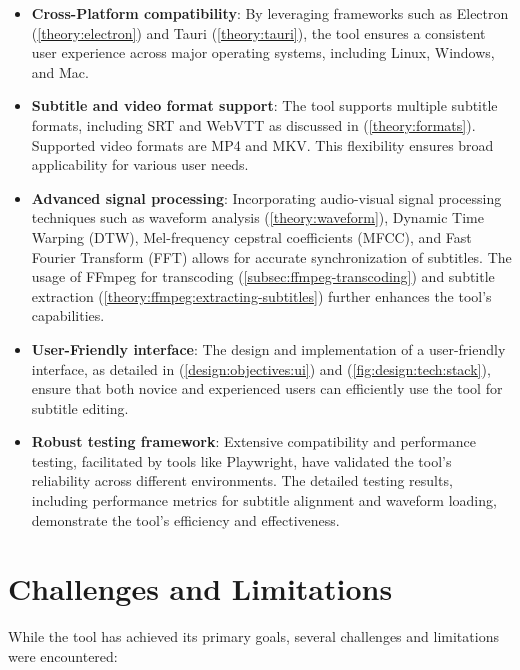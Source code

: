 \begin{itemize}
    \item \textbf{Cross-Platform compatibility}: By leveraging frameworks such as Electron (\ref{theory:electron}) and Tauri (\ref{theory:tauri}), the tool ensures a consistent user experience across major operating systems, including Linux, Windows, and Mac.

    \item \textbf{Subtitle and video format support}: The tool supports multiple subtitle formats, including SRT and WebVTT as discussed in (\ref{theory:formats}). Supported video formats are MP4 and MKV. This flexibility ensures broad applicability for various user needs.

    \item \textbf{Advanced signal processing}: Incorporating audio-visual signal processing techniques such as waveform analysis (\ref{theory:waveform}), Dynamic Time Warping (DTW), Mel-frequency cepstral coefficients (MFCC), and Fast Fourier Transform (FFT) allows for accurate synchronization of subtitles. The usage of FFmpeg for transcoding (\ref{subsec:ffmpeg-transcoding}) and subtitle extraction (\ref{theory:ffmpeg:extracting-subtitles}) further enhances the tool's capabilities.

    \item \textbf{User-Friendly interface}: The design and implementation of a user-friendly interface, as detailed in (\ref{design:objectives:ui}) and (\ref{fig:design:tech:stack}), ensure that both novice and experienced users can efficiently use the tool for subtitle editing.

    \item \textbf{Robust testing framework}: Extensive compatibility and performance testing, facilitated by tools like Playwright, have validated the tool's reliability across different environments. The detailed testing results, including performance metrics for subtitle alignment and waveform loading, demonstrate the tool's efficiency and effectiveness.
\end{itemize}

\section{Challenges and Limitations}

While the tool has achieved its primary goals, several challenges and limitations were encountered:

